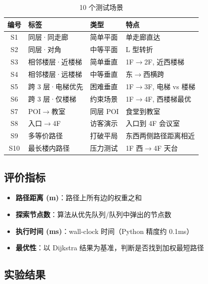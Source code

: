 \documentclass[11pt,a4paper]{ctexart}
\begin{document}
\begin{table}[htbp]
\centering
\small
\begin{tabular}{@{}clll@{}}
\toprule
编号 & 标签 & 类型 & 特点 \\
\midrule
S1 & 同层·同走廊 & 简单平面 & 单走廊直达 \\
S2 & 同层·对角 & 中等平面 & L 型转折 \\
S3 & 相邻楼层·近楼梯 & 简单垂直 & 1F$\to$2F, 近西楼梯 \\
S4 & 相邻楼层·远楼梯 & 中等垂直 & 东$\to$西横跨 \\
S5 & 跨 3 层·电梯优先 & 困难垂直 & 1F$\to$3F, 电梯 vs 楼梯 \\
S6 & 跨 3 层·仅楼梯 & 约束场景 & 1F$\to$4F, 西楼梯最优 \\
S7 & POI$\to$教室 & 同层 POI & 食堂到教室 \\
S8 & 入口$\to$4F & 访客演示 & 入口到 4F 会议室 \\
S9 & 多等价路径 & 打破平局 & 东西两侧路径距离相近 \\
S10 & 最长楼内路径 & 压力测试 & 1F 西$\to$4F 天台 \\
\bottomrule
\end{tabular}
\caption{10 个测试场景}
\end{table}

\subsection{评价指标}

\begin{itemize}
    \item \textbf{路径距离 (m)}：路径上所有边的权重之和
    \item \textbf{探索节点数}：算法从优先队列/队列中弹出的节点数
    \item \textbf{执行时间 (ms)}：wall-clock 时间（Python 精度约 0.1ms）
    \item \textbf{最优性}：以 Dijkstra 结果为基准，判断是否找到加权最短路径
\end{itemize}

\subsection{实验结果}

\end{document}
